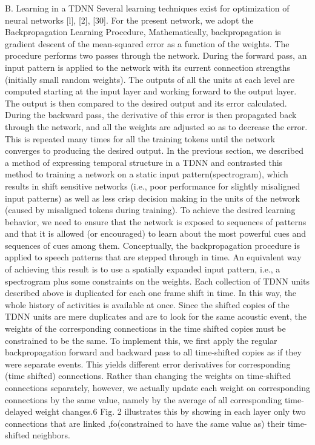 B. Learning in a TDNN
Several learning techniques exist for optimization of neural networks [l], [2], [30]. 
For the present network, we adopt the Backpropagation Learning Procedure, Mathematically, backpropagation is gradient descent  of the mean-squared error as a function of the weights.
The procedure performs two passes through the network. 
During the forward pass, an input pattern is applied to the network with its current connection strengths (initially small random weights). 
The outputs of all the units at each  level are computed starting at the input layer and working forward to the output layer. 
The output is then compared  to the desired output and its error calculated. 
During the  backward pass, the derivative of this error is then propagated back through the network, and all the weights are adjusted so as to decrease the error. 
This is repeated many times for all the training tokens until the network converges to producing the desired output. 
In the previous section, we described a method of expressing temporal structure in a TDNN and contrasted this method to training a network on a static input pattern(spectrogram), which results in shift sensitive networks (i.e., poor performance for slightly misaligned input patterns) as well as less crisp decision making in the units of the network (caused by misaligned tokens during training). 
To achieve the desired learning behavior, we need to  ensure that the network is exposed to sequences of patterns and that it is allowed (or encouraged) to learn about the most powerful cues and sequences of cues among them. 
Conceptually, the backpropagation procedure is applied to speech patterns that are stepped through in time. 
An equivalent way of achieving this result is to use a spatially expanded input pattern, i.e., a spectrogram plus some constraints on the weights. 
Each collection of TDNN units described above is duplicated for each one frame shift in time. 
In this way, the whole history of activities is available at once. 
Since the shifted copies of the TDNN units are mere duplicates and are to look for the same acoustic event, the weights of the corresponding connections in the time shifted copies must be constrained to be the same. 
To implement this, we first apply the regular backpropagation forward and backward pass to all time-shifted copies as if they were separate events. 
This yields different error derivatives for corresponding (time shifted) connections. 
Rather than changing the weights on time-shifted connections separately, however, we actually update each weight on corresponding connections by the same value, namely by the average of all corresponding time-delayed weight changes.6 Fig. 2 illustrates this by showing in each layer only two connections that  are linked ,fo(constrained to have the same value as) their time-shifted neighbors. 
